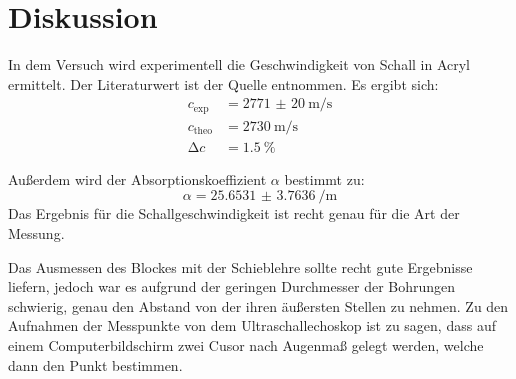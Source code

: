 \section{Diskussion}
\label{sec:Diskussion}

In dem Versuch wird experimentell die Geschwindigkeit von Schall in Acryl ermittelt. Der Literaturwert ist der Quelle \cite{cA} entnommen.
Es ergibt sich:
\begin{align*}
    c_{\text{exp}}    &= \SI{2771(20)}{\metre\per\second} \\
    c_{\text{theo}}   &= \SI{2730}{\metre\per\second} \\
    \increment c      &= \SI{1.5}{\percent}
\end{align*}

\noindent Außerdem wird der Absorptionskoeffizient $\alpha $ bestimmt zu:
\begin{equation*}
    \alpha = \SI{25.6531(37636)}{\per\metre}
\end{equation*}
Das Ergebnis für die Schallgeschwindigkeit ist recht genau für die Art der Messung. 

\noindent Das Ausmessen des Blockes mit der Schieblehre sollte recht gute Ergebnisse liefern, jedoch war es aufgrund der geringen Durchmesser der Bohrungen schwierig, 
genau den Abstand von der ihren äußersten Stellen zu nehmen. Zu den Aufnahmen der Messpunkte von dem Ultraschallechoskop ist zu sagen, dass auf einem 
Computerbildschirm zwei Cusor nach Augenmaß gelegt werden, welche dann den Punkt bestimmen. 

